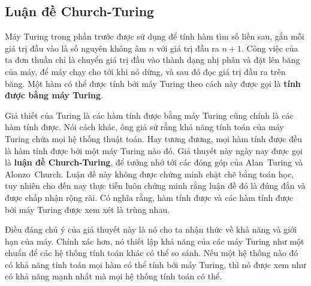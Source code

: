 \subsection*{Luận đề Church-Turing}
Máy Turing trong phần trước được sử dụng để tính hàm tìm số liền sau, gắn mỗi giá trị đầu
vào là số nguyên không âm $n$ với giá trị đầu ra $n + 1$. Công việc của ta đơn thuần chỉ
là chuyển giá trị đầu vào thành dạng nhị phân và đặt lên băng của máy, để máy chạy cho tới
khi nó dừng, và sau đó đọc giá trị đầu ra trên băng. Một hàm có thể được tính bởi máy
Turing theo cách này được gọi là \textbf{tính được bằng máy Turing}.

Giả thiết của Turing là các hàm tính được bằng máy Turing cũng chính là các hàm tính
được. Nói cách khác, ông giả sử rằng khả năng tính toán của máy Turing chứa mọi hệ thống
thuật toán. Hay tương đương, mọi hàm tính được đều là hàm tính được bởi một máy Turing nào
đó. Giả thuyết này ngày nay được gọi là \textbf{luận đề Church-Turing}, để tưởng nhớ tới
các đóng góp của Alan~Turing và Alonzo~Church. Luận đề này không được chứng minh chặt chẽ
bằng toán học, tuy nhiên cho đến nay thực tiễn luôn chứng minh rằng luận đề đó là đúng đắn
và được chấp nhận rộng rãi. Có nghĩa rằng, hàm tính được và các hàm tính được bởi máy
Turing được xem xét là trùng nhau.

Điều đáng chú ý của giả thuyết này là nó cho ta nhận thức về khả năng và giới hạn của
máy. Chính xác hơn, nó thiết lập khả năng của các máy Turing như một chuẩn để các hệ thống
tính toán khác có thể so sánh. Nếu một hệ thống nào đó có khả năng tính toán mọi hàm có
thể tính bới máy Turing, thì nó được xem như có khả năng mạnh nhất mà mọi hệ thống tính
toán có thể.


